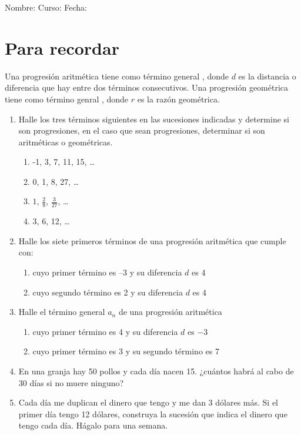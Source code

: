 \documentclass[fleqn]{article}
\newcommand{\LineaNombre}{%
\par
\vspace{\baselineskip}
Nombre:\hrulefill \; Curso: \underline{\hspace*{48pt}} \; Fecha: \underline{\hspace*{2.5cm}} \relax
\par}
\begin{document}
\LineaNombre
\section*{Para recordar}
Una progresi\'on aritmética tiene como término general , donde $d$ es la distancia o diferencia que hay entre dos términos consecutivos.
Una progresión geométrica tiene como término genral ,
donde $r$ es la razón geométrica.
\begin{enumerate}
\item Halle los tres términos siguientes en las sucesiones indicadas y determine si son progresiones, en el caso que sean progresiones, determinar si son aritméticas o geométricas.
\begin{enumerate}
\item -1, 3, 7, 11, 15, \ldots \noanswer
\item 0, 1, 8, 27, \ldots \noanswer
\item $1$, $\frac{2}{8}$, $\frac{3}{27}$, \ldots \noanswer
\item 3, 6, 12, \ldots \noanswer
\end{enumerate}
\item Halle los siete primeros términos de una progresión aritmética que cumple con:
\begin{enumerate}
\item cuyo primer término es --3 y su diferencia $d$ es 4 \noanswer[.75in]
\item cuyo segundo término es 2 y su diferencia $d$ es 4 \noanswer[.75in]
\end{enumerate}
\newpage
\item Halle el término general $a_{n}$ de una progresión aritmética
\begin{enumerate}
\item cuyo primer término es 4 y su diferencia $d$ es $-3$ \noanswer
\item cuyo primer término es 3 y su segundo término es 7 \noanswer
\end{enumerate}
\item En una granja hay 50 pollos y cada día nacen 15. ¿cuántos habrá al cabo de 30 días si no muere ninguno?\noanswer
\item Cada día me duplican el dinero que tengo y me dan 3 dólares más. Si el primer día tengo 12 dólares, construya la sucesión que indica el dinero que tengo cada día. Hágalo para una semana.\noanswer
\end{enumerate}
\end{document}
